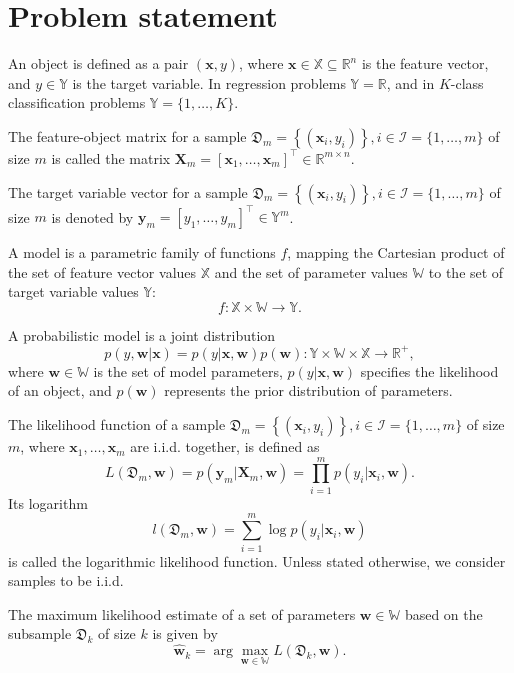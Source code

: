 \documentclass[
11pt,%
tightenlines,%
twoside,%
onecolumn,%
nofloats,%
nobibnotes,%
nofootinbib,%
superscriptaddress,%
noshowpacs,%
centertags]%
{revtex4-2}
\begin{document}
\section{Problem statement}

An object is defined as a pair $(\mathbf{x}, y)$, where $\mathbf{x} \in \mathbb{X} \subseteq \mathbb{R}^n$ is the feature vector, and $y \in \mathbb{Y}$ is the target variable. In regression problems $\mathbb{Y} = \mathbb{R}$, and in $K$-class classification problems $\mathbb{Y} = \{1, \ldots, K\}$.

The feature-object matrix for a sample $\mathfrak{D}_m = \left\{ (\mathbf{x}_i, y_i) \right\}, i \in \mathcal{I} = \{ 1, \ldots, m \}$ of size $m$ is called the matrix $\mathbf{X}_m = \left[ \mathbf{x}_1, \ldots, \mathbf{x}_m \right]^{\top} \in \mathbb{R}^{m \times n}$.

The target variable vector for a sample $\mathfrak{D}_m = \left\{ (\mathbf{x}_i, y_i) \right\}, i \in \mathcal{I} = \{ 1, \ldots, m \}$ of size $m$ is denoted by $\mathbf{y}_m = \left[ y_1, \ldots, y_m \right]^{\top} \in \mathbb{Y}^m$.

A model is a parametric family of functions $f$, mapping the Cartesian product of the set of feature vector values $\mathbb{X}$ and the set of parameter values $\mathbb{W}$ to the set of target variable values $\mathbb{Y}$: 
\[ f: \mathbb{X} \times \mathbb{W} \to \mathbb{Y}. \]

A probabilistic model is a joint distribution
\[ p(y, \mathbf{w} | \mathbf{x}) = p(y | \mathbf{x}, \mathbf{w}) p(\mathbf{w}): \mathbb{Y} \times \mathbb{W} \times \mathbb{X} \to \mathbb{R}^+, \]
where $\mathbf{w} \in \mathbb{W}$ is the set of model parameters, $p(y | \mathbf{x}, \mathbf{w})$ specifies the likelihood of an object, and $p(\mathbf{w})$ represents the prior distribution of parameters.

The likelihood function of a sample $\mathfrak{D}_m = \left\{ (\mathbf{x}_i, y_i) \right\}, i \in \mathcal{I} = \{ 1, \ldots, m \}$ of size $m$, where $\mathbf{x}_1, \ldots, \mathbf{x}_m$ are i.i.d. together, is defined as 
\[ L(\mathfrak{D}_m, \mathbf{w}) = p(\mathbf{y}_m | \mathbf{X}_m, \mathbf{w}) = \prod_{i=1}^{m} p(y_i | \mathbf{x}_i, \mathbf{w}). \]
Its logarithm
\[ l(\mathfrak{D}_m, \mathbf{w}) = \sum\limits_{i=1}^{m} \log p(y_i | \mathbf{x}_i, \mathbf{w}) \]
is called the logarithmic likelihood function. Unless stated otherwise, we consider samples to be i.i.d.

The maximum likelihood estimate of a set of parameters $\mathbf{w} \in \mathbb{W}$ based on the subsample $\mathfrak{D}_k$ of size $k$ is given by 
\[ \hat{\mathbf{w}}_{k} = \arg\max_{\mathbf{w} \in \mathbb{W}} L(\mathfrak{D}_k, \mathbf{w}). \]
\end{document}
